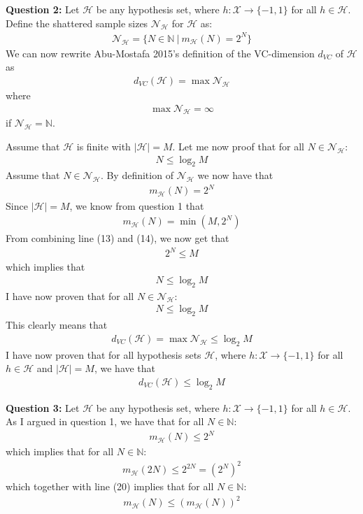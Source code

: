 \documentclass[12pt]{article}
\begin{document}
\textbf{Question 2:} Let $\mathcal{H}$ be any hypothesis set, where $h:\mathcal{X}\to \{-1,1\}$ for all $h\in \mathcal{H}$. Define the shattered sample sizes $\mathcal{N}_\mathcal{H}$ for $\mathcal{H}$ as:
\begin{align}
\mathcal{N}_\mathcal{H} = \{ N\in \mathbb{N}\ |\ m_\mathcal{H}(N) = 2^N \}
\end{align}
We can now rewrite Abu-Mostafa 2015's definition of the VC-dimension $d_{VC}$ of $\mathcal{H}$ as
\begin{align}
d_{VC}(\mathcal{H}) = \max \mathcal{N}_\mathcal{H}
\end{align}
where
\begin{align}
\max \mathcal{N}_\mathcal{H} = \infty
\end{align}
if $\mathcal{N}_\mathcal{H} = \mathbb{N}$.

Assume that $\mathcal{H}$ is finite with $|\mathcal{H}|=M$. Let me now proof that for all $N \in \mathcal{N}_\mathcal{H}$:
\begin{align}
N \leq \log_2 M
\end{align}
Assume that $N \in \mathcal{N}_\mathcal{H}$. By definition of $\mathcal{N}_\mathcal{H}$ we now have that
\begin{align}
m_\mathcal{H}(N)=2^N 
\end{align}
Since $|\mathcal{H}|=M$, we know from question 1 that
\begin{align}
m_\mathcal{H}(N)=\min(M, 2^N) 
\end{align}
From combining line (13) and (14), we now get that
\begin{align}
2^N \leq M 
\end{align}
which implies that
\begin{align}
N \leq \log_2M
\end{align}
I have now proven that for all $N \in \mathcal{N}_\mathcal{H}$:
\begin{align}
N \leq \log_2 M
\end{align}
This clearly means that 
\begin{align}
d_{VC}(\mathcal{H}) = \max \mathcal{N}_\mathcal{H} \leq \log_2 M
\end{align}
I have now proven that for all hypothesis sets $\mathcal{H}$, where $h:\mathcal{X}\to \{-1,1\}$ for all $h\in \mathcal{H}$ and $|\mathcal{H}|=M$, we have that
\begin{align}
d_{VC}(\mathcal{H}) \leq \log_2 M
\end{align}

\textbf{Question 3:} Let $\mathcal{H}$ be any hypothesis set, where $h:\mathcal{X}\to \{-1,1\}$ for all $h\in \mathcal{H}$. As I argued in question 1, we have that for all $N \in \mathbb{N}$:
\begin{align}
m_\mathcal{H}(N) \leq 2^N
\end{align}
which implies that for all $N \in \mathbb{N}$:
\begin{align}
m_\mathcal{H}(2N) \leq 2^{2N} = \left(2^N\right)^2
\end{align}
which together with line (20) implies that for all $N \in \mathbb{N}$:
\begin{align}
m_\mathcal{H}(N) \leq \left( m_\mathcal{H}(N) \right)^2
\end{align}
\end{document}
